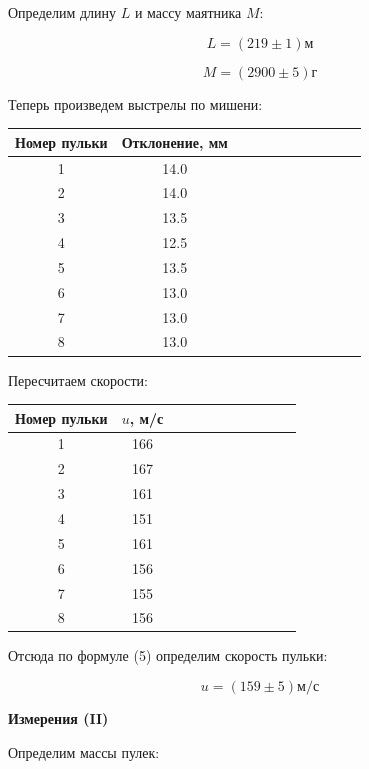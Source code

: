 \documentclass[14pt]{article}
\begin{document}
\vspace{0.5cm}
Определим длину $L$ и массу маятника $M$:

$$
	L = (219 \pm 1) \text{м}
$$

$$
	M = (2900 \pm 5) \text{г}
$$

\vspace{0.5cm}

Теперь произведем выстрелы по мишени:
\begin{center}
\begin{tabular}{|c|c|c|c|c|c|c|c|c|c|c|}
\hline
Номер пульки	&	Отклонение, мм		\\
\hline
1				&	14.0				\\
\hline
2				&	14.0				\\
\hline
3				&	13.5				\\
\hline
4				&	12.5				\\
\hline
5				&	13.5				\\
\hline
6				&	13.0				\\
\hline
7				&	13.0				\\
\hline
8				&	13.0				\\
\hline
\end{tabular}
\end{center}

Пересчитаем скорости:
\begin{center}
\begin{tabular}{|c|c|c|c|c|c|c|c|c|c|c|}
\hline
Номер пульки	&	$u$, м/с			\\
\hline
1				&	166					\\
\hline
2				&	167					\\
\hline
3				&	161					\\
\hline
4				&	151					\\
\hline
5				&	161					\\
\hline
6				&	156					\\
\hline
7				&	155					\\
\hline
8				&	156					\\
\hline
\end{tabular}
\end{center}

Отсюда по формуле (5) определим скорость пульки:

$$
	u = (159 \pm 5) \text{м/с}
$$


\newpage
\textbf{Измерения (II)}

Определим массы пулек:
\end{document}
